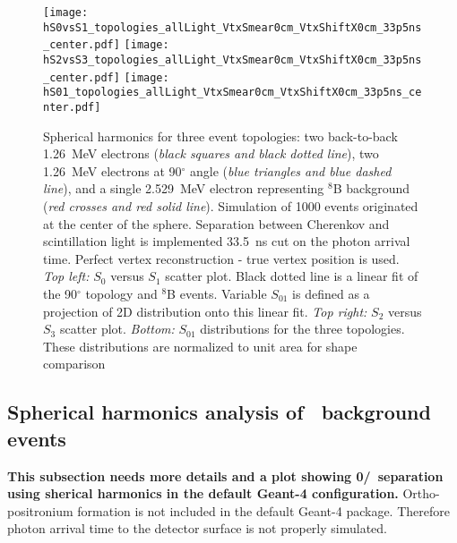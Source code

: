 \begin{figure*}[h]
  \centering
  \texttt{[image: hS0vsS1\_topologies\_allLight\_VtxSmear0cm\_VtxShiftX0cm\_33p5ns\_center.pdf]}
  \texttt{[image: hS2vsS3\_topologies\_allLight\_VtxSmear0cm\_VtxShiftX0cm\_33p5ns\_center.pdf]}
  \texttt{[image: hS01\_topologies\_allLight\_VtxSmear0cm\_VtxShiftX0cm\_33p5ns\_center.pdf]}
  \caption{Spherical harmonics for three event topologies: two
    back-to-back 1.26~MeV electrons (\emph{black squares and black
      dotted line}), two 1.26~MeV electrons at 90$^{\circ}$ angle
    (\emph{blue triangles and blue dashed line}), and a single
    2.529~MeV electron representing $^{8}$B background (\emph{red
      crosses and red solid line}). Simulation of 1000 events
    originated at the center of the sphere. Separation between
    Cherenkov and scintillation light is implemented 33.5~ns cut on
    the photon arrival time. Perfect vertex reconstruction - true
    vertex position is used. \emph{Top left:} $S_0$ versus $S_1$
    scatter plot. Black dotted line is a linear fit of the
    90$^{\circ}$ topology and $^{8}$B events. Variable $S_{01}$ is
    defined as a projection of 2D distribution onto this linear
    fit. \emph{Top right:} $S_2$ versus $S_3$ scatter
    plot. \emph{Bottom:} $S_{01}$ distributions for the three
    topologies. These distributions are normalized to unit area for
    shape comparison}
\label{fig:SL_topologies_all}
\end{figure*}


\endgroup


\subsection{Spherical harmonics analysis of \C~background events}
\label{subsec:c10_spherical_harmonics}
\textbf{This subsection needs more details and a plot showing 0\nbb/\C~separation using sherical harmonics in the default Geant-4 configuration.}
Ortho-positronium formation is not included in the default Geant-4 package. Therefore photon arrival time to the detector surface is not 
properly simulated.
